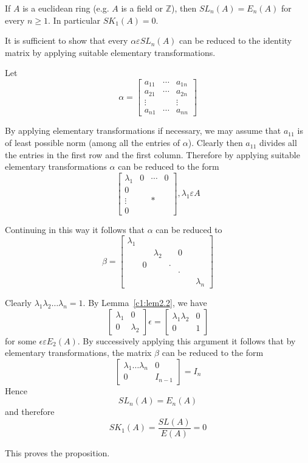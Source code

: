 \begin{Prop}\label{c1:Prop2.4}
If $A$ is a euclidean ring (e.g. $A$ is a field or $\mathbb{Z}$), then
$SL_n(A)=E_n(A)$ for every $n\geq 1$. In particular $SK_1(A)=0$.
\end{Prop}

\begin{Proof}
It is sufficient to show that every $\alpha \varepsilon SL_n(A)$ can
be reduced to the identity matrix by applying suitable elementary
transformations.

Let 
$$
\alpha=
\begin{bmatrix}
a_{11} & \cdots & a_{1n}\\
a_{21} & \cdots & a_{2n}\\
\vdots & & \vdots\\
a_{n1} & \cdots & a_{nn}
\end{bmatrix}
$$

By applying elementary transformations if necessary, we may assume
that $a_{11}$ is of least possible norm (among all the entries of
$\alpha$). Clearly then $a_{11}$ divides all the entries in the first
row and the first column. Therefore by applying suitable elementary
transformations $\alpha$ can be reduced to the form
$$
\begin{bmatrix}
\lambda_1 & 0 &\cdots & 0\\
0 & & &\\
\vdots &  &\ast &\\
0 & & &
\end{bmatrix}, \lambda_1\varepsilon A
$$

Continuing in this way it follows that $\alpha$ can be reduced to 
$$
\beta=
\begin{bmatrix}
\lambda_1 & & & & & &\\
& &\lambda_2 & & 0 &\\
& 0 & &\cdot & &\\
& & & & \cdot &\\
& & & & & & \lambda_n
\end{bmatrix}
$$

Clearly $\lambda_1\lambda_2\ldots \lambda_n=1$. By
Lemma~\ref{c1:lem2.2}, we have 
$$
\begin{bmatrix}
\lambda_1 & 0\\
0 & \lambda_2
\end{bmatrix} \epsilon = \begin{bmatrix}
\lambda_1\lambda_2 & 0\\
0 & 1
\end{bmatrix}
$$
for some $\epsilon\varepsilon E_2(A)$. By successively applying this argument
it follows that by elementary transformations, the matrix $\beta$ can
be reduced to the form 
$$
\begin{bmatrix}
\lambda_1\ldots\lambda_n & 0\\
0 & I_{n-1}
\end{bmatrix} = I_n
$$
Hence
$$
SL_n(A)=E_n(A)
$$
and therefore
$$
SK_1(A)=\dfrac{SL(A)}{E(A)} = 0
$$

This proves the proposition.
\enprf
\end{Proof}

